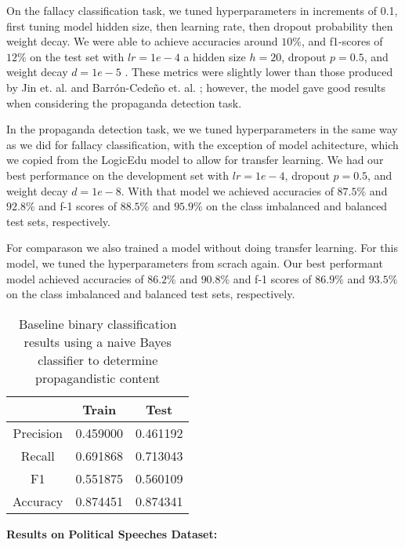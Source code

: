 \documentclass[conference]{IEEEtran}
\begin{document}
On the fallacy classification task, we tuned hyperparameters in increments of 0.1, first tuning model hidden size, then learning rate, then dropout probability then weight decay. We were able to achieve accuracies around $10\%$, and f1-scores of $12\%$ on the test set with $lr= 1e-4$ a hidden size $h=20$, dropout $p = 0.5$, and weight decay $d= 1e-5$ . These metrics were slightly lower than those produced by Jin et. al. and Barrón-Cedeño et. al. \cite{Proppy,jin2022logical}; however, the model gave good results when considering the propaganda detection task. 

In the propaganda detection task, we we tuned hyperparameters in the same way as we did for fallacy classification, with the exception of model achitecture, which we copied from the LogicEdu model to allow for transfer learning. We had our best performance on the development set with $lr=1e-4$, dropout $p=0.5$, and weight decay $d= 1e-8$. With that model we achieved accuracies of $87.5\%$ and $92.8\%$ and f-1 scores of $88.5\%$ and $95.9\%$ on the class imbalanced and balanced test sets, respectively. 

For comparason we also trained a model without doing transfer learning. For this model, we tuned the hyperparameters from scrach again. Our best performant model achieved accuracies of $86.2\%$ and $90.8\%$ and f-1 scores of $86.9\%$ and $93.5\%$ on the class imbalanced and balanced test sets, respectively. 


\begin{table}[pb]
\label{table:naiveBayes}
    \centering
    \begin{tabular}{c|c c}
 	& Train &	Test\\\hline
Precision &	0.459000 &	0.461192\\
Recall    & 0.691868 &	0.713043\\
F1        &	0.551875 &	0.560109\\
Accuracy  &	0.874451 &	0.874341 
\end{tabular}
    \caption{Baseline binary classification results using a naive Bayes classifier to determine propagandistic content}
    \label{tab:baseline_outputs}
\end{table}




\textbf{Results on Political Speeches Dataset:} 


\end{document}
